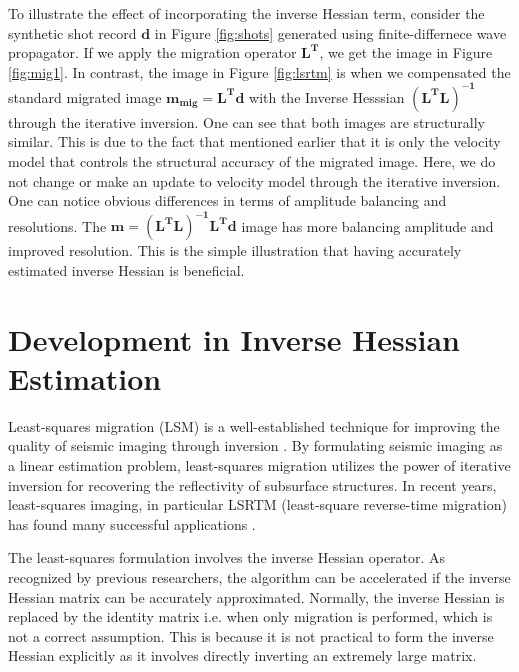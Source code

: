 



To illustrate the effect of incorporating the inverse Hessian term, consider the synthetic shot record $\mathbf{d}$ in Figure \ref{fig:shots} generated using finite-differnece wave propagator. If we apply the migration operator $\mathbf{L^T}$, we get the image in Figure \ref{fig:mig1}. In contrast, the image in Figure \ref{fig:lsrtm} is when we compensated the standard migrated image $\mathbf{m_{mig} = L^{T}d }$ with the Inverse Hesssian $\mathbf{(L^{T}L)^{-1}}$ through the iterative inversion. One can see that both images are structurally similar. This is due to the fact that mentioned earlier that it is only the velocity model that controls the structural accuracy of the migrated image. Here, we do not change or make an update to velocity model through the iterative inversion. One can notice obvious differences in terms of amplitude balancing and resolutions. The $\mathbf{m = (L^{T}L)^{-1} L^{T} d}$ image has more balancing amplitude and improved resolution. This is the simple illustration that having accurately estimated inverse Hessian is beneficial.


\section{Development in Inverse Hessian Estimation}

Least-squares migration (LSM) is a well-established technique for improving the quality of seismic imaging through inversion \cite[]{nemeth,ronen}. By formulating seismic imaging as a linear estimation problem, least-squares migration utilizes the power of iterative inversion for recovering the reflectivity of subsurface structures. In recent years, least-squares imaging, in particular LSRTM (least-square reverse-time migration) has found many successful applications \cite[]{dai,wang,wong}.

The least-squares formulation involves the inverse Hessian operator. As recognized by previous researchers, the algorithm can be accelerated if the inverse Hessian matrix can be accurately approximated. Normally, the inverse Hessian is replaced by the identity matrix i.e. when only migration is performed, which is not a correct assumption. This is because it is not practical to form the inverse Hessian explicitly as it involves directly inverting an extremely large matrix.

